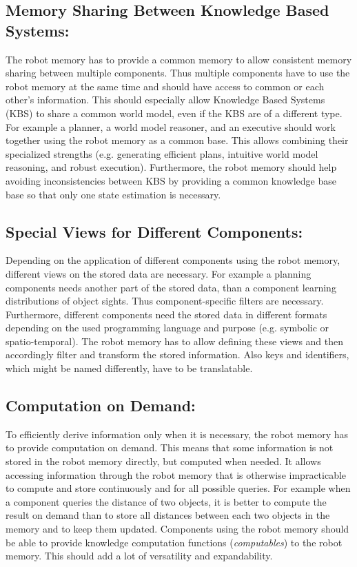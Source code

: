 \subsection{Memory Sharing Between Knowledge Based Systems:}
The robot memory has to provide a common memory to allow consistent
memory sharing between multiple components. Thus multiple components have to
use the robot memory at the same time and should have access to common
or each other's information. This should especially allow Knowledge
Based Systems (KBS) to share a common world model, even if the KBS are
of a different type. For example a planner, a world model reasoner,
and an executive should work together using the robot memory as a
common base. This allows combining their specialized strengths
(e.g. generating efficient plans, intuitive world model reasoning, and
robust execution). Furthermore, the robot memory should help avoiding
inconsistencies between KBS by providing a common knowledge base base so that
only one state estimation is necessary.

\subsection{Special Views for Different Components:} Depending on the
application of different components using the robot memory, different
views on the stored data are necessary. For example a planning
components needs another part of the stored data, than a component
learning distributions of object sights. Thus component-specific
filters are necessary. Furthermore, different components need the
stored data in different formats depending on the used programming
language and purpose (e.g. symbolic or spatio-temporal). The robot
memory has to allow defining these views and then accordingly filter
and transform the stored information. Also keys and identifiers, which
might be named differently, have to be translatable.

\subsection{Computation on Demand:}
  To efficiently derive
information only when it is necessary, the robot memory has to provide
computation on demand. This means that some information is not stored
in the robot memory directly, but computed when needed. It allows
accessing information through the robot memory that is otherwise
impracticable to compute and store continuously and for all possible
queries. For example when a component queries the distance of two
objects, it is better to compute the result on demand than to store
all distances between each two objects in the memory and to keep them
updated. Components using the robot memory should be able to provide
knowledge computation functions (\emph{computables}) to the robot
memory. This should add a lot of versatility and expandability.

